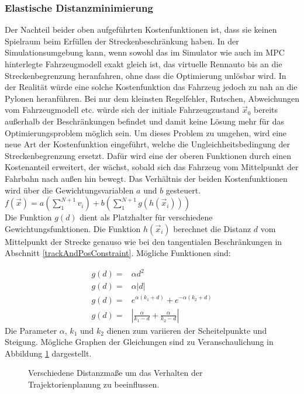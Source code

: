 \documentclass{like}
\begin{document}
\subsubsection*{Elastische Distanzminimierung}
Der Nachteil beider oben aufgeführten Kostenfunktionen ist, dass sie keinen Spielraum beim Erfüllen der Streckenbeschränkung haben. In der Simulationsumgebung kann, wenn sowohl das im Simulator wie auch im \ac{MPC} hinterlegte Fahrzeugmodell exakt gleich ist, das virtuelle Rennauto bis an die Streckenbegrenzung heranfahren, ohne dass die Optimierung unlösbar wird. In der Realität würde eine solche Kostenfunktion das Fahrzeug jedoch zu nah an die Pylonen heranführen. Bei nur dem kleinsten Regelfehler, Rutschen, Abweichungen vom Fahrzeugmodell etc. würde sich der initiale Fahrzeugzustand $\vec{x}_0$ bereits außerhalb der Beschränkungen befindet und damit keine Lösung mehr für das Optimierungsproblem möglich sein. Um dieses Problem zu umgehen, wird eine neue Art der Kostenfunktion eingeführt, welche die Ungleichheitsbedingung der Streckenbegrenzung ersetzt. Dafür wird eine der oberen Funktionen durch einen Kostenanteil erweitert, der wächst, sobald sich das Fahrzeug vom Mittelpunkt der Fahrbahn nach außen hin bewegt. Das Verhältnis der beiden Kostenfunktionen wird über die Gewichtungsvariablen \(a\) und \(b\) gesteuert.\\
$f(\vec{x}) = a (\sum_{1}^{N+1} v_i) + b(\sum_{1}^{N+1} g(h(\vec{x}_i)))$  \\
Die Funktion $g(d)$ dient als Platzhalter für verschiedene Gewichtungsfunktionen. Die Funktion $h(\vec{x}_i)$ berechnet die Distanz \(d\) vom Mittelpunkt der Strecke genauso wie bei den tangentialen Beschränkungen in Abschnitt \ref{trackAndPosConstraint}. Mögliche Funktionen sind:

\begin{eqnarray}
	g(d) = &\alpha d^2 \\
	g(d) = &\alpha |d|\\
	g(d) = &e^{\alpha (k_1 + d)} + e^{-\alpha(k_2 + d)} \label{eq:distMeasure1}\\
	g(d) = &|\frac{\alpha}{k_1-d} + \frac{\alpha}{k_2 - d}| \label{eq:distMeasure2}
\end{eqnarray}
Die Parameter $\alpha$, $k_1$ und $k_2$ dienen zum variieren der Scheitelpunkte und Steigung.
Mögliche Graphen der Gleichungen sind zu Veranschaulichung in Abbildung \ref{fig:elasticCost} dargestellt.

\begin{figure}[ht!]
	\centering
	 
	\caption{Verschiedene Distanzmaße um das Verhalten der Trajektorienplanung zu beeinflussen.}
	\label{fig:elasticCost}
\end{figure}
\end{document}
